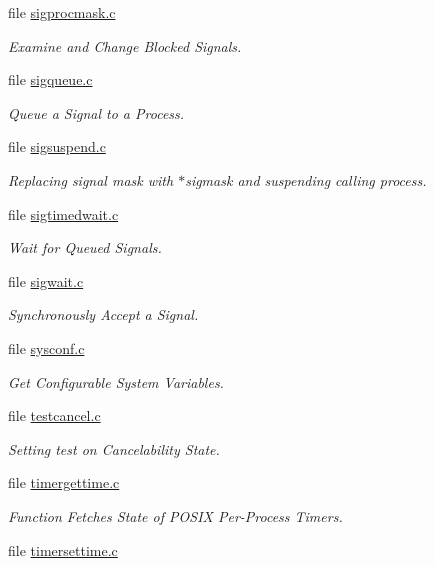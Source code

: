 \begin{DoxyCompactItemize}
file \mbox{\hyperlink{sigprocmask_8c}{sigprocmask.\+c}}
\begin{DoxyCompactList}\small\item\em Examine and Change Blocked Signals. \end{DoxyCompactList}\item 
file \mbox{\hyperlink{sigqueue_8c}{sigqueue.\+c}}
\begin{DoxyCompactList}\small\item\em Queue a Signal to a Process. \end{DoxyCompactList}\item 
file \mbox{\hyperlink{sigsuspend_8c}{sigsuspend.\+c}}
\begin{DoxyCompactList}\small\item\em Replacing signal mask with $\ast$sigmask and suspending calling process. \end{DoxyCompactList}\item 
file \mbox{\hyperlink{sigtimedwait_8c}{sigtimedwait.\+c}}
\begin{DoxyCompactList}\small\item\em Wait for Queued Signals. \end{DoxyCompactList}\item 
file \mbox{\hyperlink{sigwait_8c}{sigwait.\+c}}
\begin{DoxyCompactList}\small\item\em Synchronously Accept a Signal. \end{DoxyCompactList}\item 
file \mbox{\hyperlink{sysconf_8c}{sysconf.\+c}}
\begin{DoxyCompactList}\small\item\em Get Configurable System Variables. \end{DoxyCompactList}\item 
file \mbox{\hyperlink{testcancel_8c}{testcancel.\+c}}
\begin{DoxyCompactList}\small\item\em Setting test on Cancelability State. \end{DoxyCompactList}\item 
file \mbox{\hyperlink{timergettime_8c}{timergettime.\+c}}
\begin{DoxyCompactList}\small\item\em Function Fetches State of P\+O\+S\+IX Per-\/\+Process Timers. \end{DoxyCompactList}\item 
file \mbox{\hyperlink{timersettime_8c}{timersettime.\+c}}

\end{DoxyCompactItemize}
